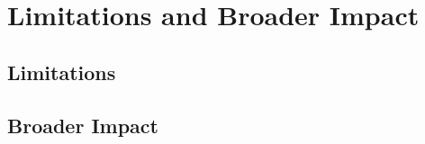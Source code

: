 \section{Limitations and Broader Impact}
\label{sec:limitations}

\subsection{Limitations}

\subsection{Broader Impact}
